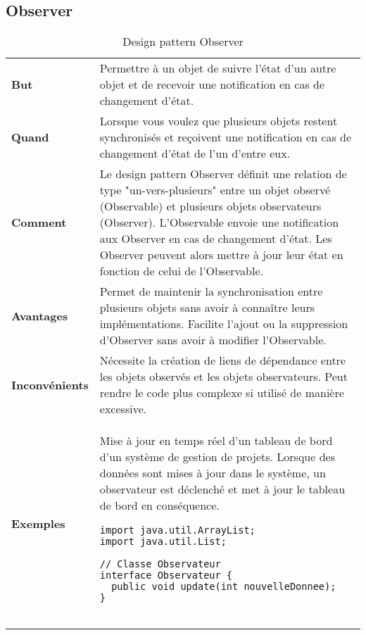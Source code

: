 \subsection{Observer}\label{subsec:observer}
\begin{table}[H]
\caption{Design pattern Observer}
\label{tbl:design_patterns_observer}
\begin{adjustbox}{max width=\textwidth}
\begin{tabular}{l|p{\textwidth}}
\toprule
\textbf{But} & Permettre à un objet de suivre l'état d'un autre objet et de recevoir une notification en cas de changement d'état.\\
\cmidrule(lr){1-2}
\textbf{Quand} & Lorsque vous voulez que plusieurs objets restent synchronisés et reçoivent une notification en cas de changement d'état de l'un d'entre eux.\\
\cmidrule(lr){1-2}
\textbf{Comment} & Le design pattern Observer définit une relation de type "un-vers-plusieurs" entre un objet observé (Observable) et plusieurs objets observateurs (Observer). L'Observable envoie une notification aux Observer en cas de changement d'état. Les Observer peuvent alors mettre à jour leur état en fonction de celui de l'Observable.\\
\cmidrule(lr){1-2}
\textbf{Avantages} & Permet de maintenir la synchronisation entre plusieurs objets sans avoir à connaître leurs implémentations. Facilite l'ajout ou la suppression d'Observer sans avoir à modifier l'Observable.\\
\cmidrule(lr){1-2}
\textbf{Inconvénients} & Nécessite la création de liens de dépendance entre les objets observés et les objets observateurs. Peut rendre le code plus complexe si utilisé de manière excessive.\\
\cmidrule(lr){1-2}
\textbf{Exemples} & 
\hspace{4mm}
\begin{minipage}[tl]{0.5\textwidth}
\begin{minipage}[t]{1\textwidth}
Mise à jour en temps réel d'un tableau de bord d'un système de gestion de projets. Lorsque des données sont mises à jour dans le système, un observateur est déclenché et met à jour le tableau de bord en conséquence.   
\end{minipage}
\begin{minipage}[b]{1\textwidth}
\begin{lstlisting}[style=monstyle]
import java.util.ArrayList;
import java.util.List;

// Classe Observateur
interface Observateur {
  public void update(int nouvelleDonnee);
}


\end{lstlisting}
\end{minipage}
\end{minipage}
\end{tabular}
\end{adjustbox}
\end{table}
